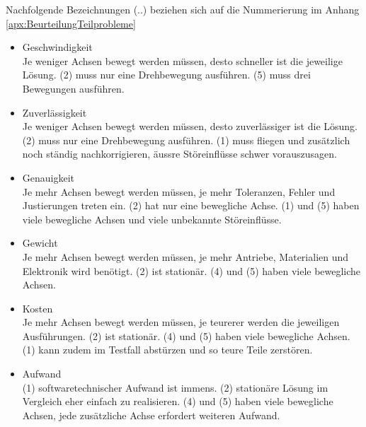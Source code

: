 		Nachfolgende Bezeichnungen (..) beziehen sich auf die Nummerierung im Anhang \ref{apx:BeurteilungTeilprobleme}			
			\begin{itemize}
				\item Geschwindigkeit\\
				Je weniger Achsen bewegt werden müssen, desto schneller ist die jeweilige Lösung. (2) muss nur eine Drehbewegung ausführen. (5) muss drei Bewegungen ausführen.
				\item Zuverlässigkeit\\
				Je weniger Achsen bewegt werden müssen, desto zuverlässiger ist die Lösung. (2) muss nur eine Drehbewegung ausführen. (1) muss fliegen und zusätzlich noch ständig nachkorrigieren, äussre Störeinflüsse schwer vorauszusagen.
				\item Genauigkeit\\
				Je mehr Achsen bewegt werden müssen, je mehr Toleranzen, Fehler und Justierungen treten ein. (2) hat nur eine bewegliche Achse. (1) und (5) haben viele bewegliche Achsen und viele unbekannte Störeinflüsse.
				\item Gewicht\\
				Je mehr Achsen bewegt werden müssen, je mehr Antriebe, Materialien und Elektronik wird benötigt. (2) ist stationär. (4) und (5) haben viele bewegliche Achsen. 
				\item Kosten\\
				Je mehr Achsen bewegt werden müssen, je teurerer werden die jeweiligen Ausführungen. (2) ist stationär. (4) und (5) haben viele bewegliche Achsen. (1) kann zudem im Testfall abstürzen und so teure Teile zerstören.
				\item Aufwand\\
				(1) softwaretechnischer Aufwand ist immens. (2) stationäre Lösung im Vergleich eher einfach zu realisieren. (4) und (5) haben viele bewegliche Achsen, jede zusätzliche Achse erfordert weiteren Aufwand.	
			\end{itemize}

